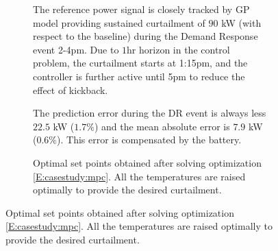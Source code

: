 %	
%	
%		
\begin{figure}[t!]
	\centering
	\begin{subfigure}
		\centering
		\setlength{}
		\setlength{}	
		
		\caption{The reference power signal is closely tracked by GP model providing sustained curtailment of \(90\) kW (with respect to the baseline) during the Demand Response event 2-4pm. Due to \(1\)hr horizon in the control problem, the curtailment starts at 1:15pm, and the controller is further active until 5pm to reduce the effect of kickback.}
		\label{F:control:tracking}
	\end{subfigure}
	\begin{subfigure}
		\centering
		\setlength{}
		\setlength{}	
		
		\caption{The prediction error during the DR event is always less \(22.5\) kW (\(1.7\%\)) and the mean absolute error is \(7.9\) kW (\(0.6\%\)). This error is compensated by the battery.}
		\label{F:control:error}
	\end{subfigure}
	\begin{subfigure}
		\centering
		\setlength{}
		\setlength{}	
			
		\caption{Optimal set points obtained after solving optimization \eqref{E:casestudy:mpc}. All the temperatures are raised optimally to provide the desired curtailment.}
		\label{F:control:inputs}
	\end{subfigure}
\end{figure}

